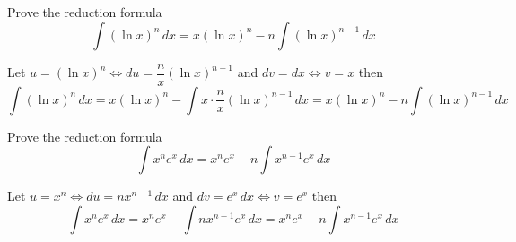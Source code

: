 \begin{problem}
    Prove the reduction formula
    \[\int(\ln x)^n\,dx=x(\ln x)^n-n\int(\ln x)^{n-1}\,dx\]
\end{problem}
\begin{solution}
    Let \(u=(\ln x)^n\iff du=\dfrac{n}{x}(\ln x)^{n-1}\) and \(dv=dx\iff v=x\)
    then
    \[\int(\ln x)^n\,dx=x(\ln x)^n-\int x\cdot\frac{n}{x}(\ln x)^{n-1}\,dx
    =x(\ln x)^n-n\int(\ln x)^{n-1}\,dx\]
\end{solution}
\begin{problem}
    Prove the reduction formula
    \[\int x^n e^x\,dx=x^n e^x-n\int x^{n-1}e^x\,dx\]
\end{problem}
\begin{solution}
    Let \(u=x^n\iff du=nx^{n-1}\,dx\) and \(dv=e^x\,dx\iff v=e^x\) then
    \[\int x^n e^x\,dx=x^n e^x-\int nx^{n-1}e^x\,dx
    =x^n e^x-n\int x^{n-1}e^x\,dx\]
\end{solution}